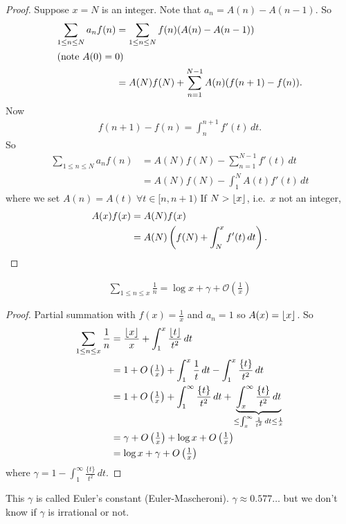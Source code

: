 \documentclass{article}
\newcommand{\bigO}{\mathcal{O}}
\DeclarePairedDelimiter\floor{\lfloor}{\rfloor}
\begin{document}
\begin{proof}
  Suppose $x = N$ is an integer. Note that $a_n = A(n) - A(n-1)$.
  So
  \begin{align*}
    \sum_{1 \leq n \leq N} a_n f(n) &= \sum_{1 \leq n \leq N} f(n) (A(n) - A(n-1)) \\
    \shortintertext{(note $A(0) = 0$)}
    &= A(N) f(N) + \sum_{n=1}^{N-1} A(n) (f(n+1)-f(n)).
  \end{align*}
  Now
  \begin{align*}f(n+1)-f(n) = \int_{n}^{n+1} f'(t) \, dt.\end{align*}
  So
  \begin{align*}
    \sum_{1 \leq n \leq N} a_n f(n) &= A(N) f(N) - \sum_{n=1}^{N-1} f'(t) \, dt \\
                                    &= A(N) f(N) - \int_1^N A(t) f'(t) \, dt
  \end{align*}
  where we set $A(n) = A(t) \; \forall t \in [n, n+1)$ %
  If $N > \floor{x}$, i.e.\ $x$ not an integer,
  \begin{align*}
    A(x) f(x) &= A(N) f(x) \\
              &= A(N) \left(f(N) + \int_N^x f'(t) \, dt\right). \qedhere
  \end{align*}
\end{proof}
\begin{nlemma}\label{lem:2}
  \begin{align*}
    \sum_{1 \leq n \leq x} \frac{1}{n} = \log x + \gamma + \bigO\left(\tfrac{1}{x}\right)
  \end{align*}
\end{nlemma}
\begin{proof}
  Partial summation with $f(x) = \frac{1}{x}$ and $a_n = 1$ so $A(x) = \floor{x}$. So
  \begin{align*}
    \sum_{1 \leq n \leq x} \frac{1}{n} &= \frac{\floor{x}}{x} + \int_1^x \frac{\floor{t}}{t^2}\,dt \\
                                       &= 1 + O\left(\tfrac{1}{x}\right) + \int_1^x \frac{1}{t}\,dt - \int_1^x \frac{\{t\}}{t^2}\,dt \\
                                       &= 1 + O\left(\tfrac{1}{x}\right) + \int_1^\infty \frac{\{t\}}{t^2} \, dt + \underbrace{\int_x^\infty \frac{\{t\}}{t^2}\,dt}_{\leq \int_x^\infty \frac{1}{t^2}\,dt \leq \frac{1}{x}} \\
                                       &=\gamma + O\left(\tfrac{1}{x}\right) + \log x + O\left(\tfrac{1}{x}\right) \\
                                       &= \log x + \gamma + O\left(\tfrac{1}{x}\right)
  \end{align*}
  where $\gamma = 1 - \int_1^\infty \frac{\{t\}}{t^2} \, dt$.
\end{proof}
This $\gamma$ is called Euler's constant (Euler-Mascheroni). $\gamma \approx 0.577\dots$ but we don't know if $\gamma$ is irrational or not.
\end{document}
